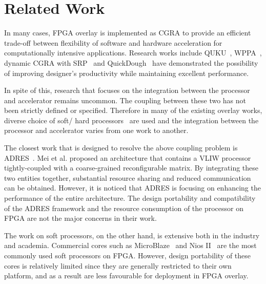 \section{Related Work}
\label{sec:related}

In many cases, FPGA overlay is implemented as CGRA to provide an efficient trade-off between flexibility of software and hardware acceleration for computationally intensive applications. Research works include QUKU~\cite{quku}, WPPA~\cite{Kissler}, dynamic CGRA with SRP~\cite{Ricardo} and QuickDough~\cite{quickdough_fsp, quickdough} have demonstrated the possibility of improving designer's productivity while maintaining excellent performance.
 

In spite of this, research that focuses on the integration between the processor and accelerator remains uncommon. The coupling between these two has not been strictly defined or specified. Therefore in many of the existing overlay works, diverse choice of soft/ hard processors~\cite{Kissler,Ricardo,quickdough} are used and the integration between the processor and accelerator varies from one work to another.

The closest work that is designed to resolve the above coupling problem is ADRES~\cite{adres}. Mei et al. proposed an architecture that contains a VLIW processor tightly-coupled with a coarse-grained reconfigurable matrix. By integrating these two entities together, substantial resource sharing and reduced communication can be obtained. However, it is noticed that ADRES is focusing on enhancing the performance of the entire architecture. The design portability and compatibility of the ADRES framework and the resource consumption of the processor on FPGA are not the major concerns in their work.

The work on soft processors, on the other hand, is extensive both in the industry and academia.
Commercial cores such as MicroBlaze~\cite{microblaze} and Nios II~\cite{niosII} are the most commonly used soft processors on FPGA. However, design portability of these cores is relatively limited since they are generally restricted to their own platform, and as a result are less favourable for deployment in FPGA overlay.


